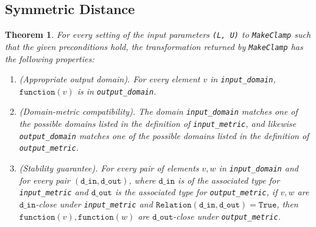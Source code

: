 \documentclass[11pt,a4paper]{article}
\newtheorem{theorem}{Theorem}
\theoremstyle{definition}
\newcommand{\din}{\texttt{d\_in}}
\newcommand{\dout}{\texttt{d\_out}}
\newcommand{\Relation}{\texttt{Relation}}
\newcommand{\True}{\texttt{True}}
\newcommand{\function}{\texttt{function}}
\begin{document}
\subsection{Symmetric Distance}
\begin{theorem}
    For every setting of the input parameters \texttt{(L, U)} to \texttt{MakeClamp} such that the given preconditions
    hold, the transformation returned by \texttt{MakeClamp} has the following properties:
    \begin{enumerate}
        \item \textup{(Appropriate output domain).} For every element $v$ in \texttt{input\_domain}, $\function(v)$ is in \texttt{output\_domain}. %
        
        \item \textup{(Domain-metric compatibility).} The domain \texttt{input\_domain} matches one of the possible domains listed in the definition of \texttt{input\_metric}, and likewise \texttt{output\_domain} matches one of the possible domains listed in the definition of \texttt{output\_metric}.
        
        \item \textup{(Stability guarantee).} For every pair of elements $v, w$ in \texttt{input\_domain} and for every pair $(\din, \dout)$, where $\din$ is of the associated type for \texttt{input\_metric} and $\dout$ is the associated type for \texttt{output\_metric}, if $v,w$ are $\din$-close under \texttt{input\_metric} and $\Relation(\din, \dout) = \True$, then $\function(v), \function(w)$ are $\dout$-close under \texttt{output\_metric}.
    \end{enumerate}
\end{theorem}
\end{document}

